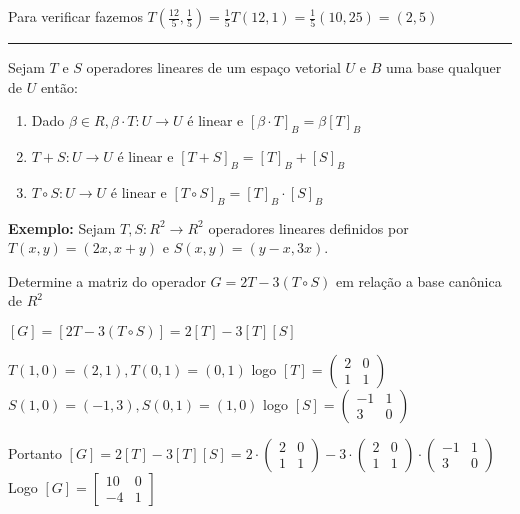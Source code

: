 \documentclass[10pt,landscape]{article}
\begin{document}
\begin{multicols}{3}
Para verificar fazemos $T\left(\frac{12}{5},\frac{1}{5}\right)=\frac{1}{5}T(12,1)=\frac{1}{5}(10,25)=(2,5)$

\medskip 
\hrule
\medskip

Sejam $T$ e $S$ operadores lineares de um espaço vetorial $U$ e $B$ uma base qualquer de $U$ então:

\begin{enumerate}[label=(\roman*),wide=0pt]

\item Dado $\beta \in R, \beta \cdot T:U\rightarrow U$ é linear e $[\beta\cdot T]_B=\beta[T]_B$
\item $T+S:U\rightarrow U$ é linear e $[T+S]_B=[T]_B+[S]_B$
\item $T\circ S:U\rightarrow U$ é linear e $[T\circ S]_B=[T]_B\cdot [S]_B$

\end{enumerate}

\textbf{Exemplo: } Sejam $T,S:R^2\rightarrow R^2$ operadores lineares definidos por $T(x,y)=(2x,x+y)$ e $S(x,y)=(y-x,3x)$.

Determine a matriz do operador $G=2T-3(T\circ S)$ em relação a base canônica de $R^2$

$[G]=[2T-3(T\circ S)]=2[T]-3[T][S]$

$T(1,0)=(2,1), T(0,1)=(0,1)$ logo $[T]=\begin{pmatrix}2&0\\1&1\end{pmatrix}$\\
$S(1,0)=(-1,3), S(0,1)=(1,0)$ logo $[S]=\begin{pmatrix}-1&1\\3&0\end{pmatrix}$

Portanto $[G]=2[T]-3[T][S]=2\cdot\begin{pmatrix}2&0\\1&1\end{pmatrix}-3\cdot\begin{pmatrix}2&0\\1&1\end{pmatrix}\cdot\begin{pmatrix}-1&1\\3&0\end{pmatrix}$\\

Logo $[G]=\begin{bmatrix}10&0\\-4&1\end{bmatrix}$


\end{multicols}
\end{document}
